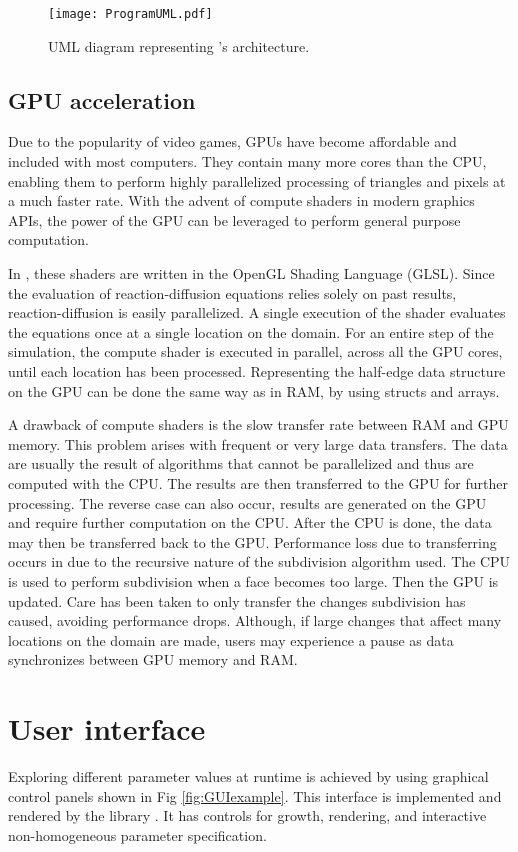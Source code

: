 \begin{figure}[H]
	\centering
	\texttt{[image: ProgramUML.pdf]}
	\caption{UML diagram representing \ProgramName{}'s architecture.}
	\label{fig:umlDiagram}
\end{figure}

\subsection{GPU acceleration}
Due to the popularity of video games, GPUs have become affordable and included with most computers. They contain many more cores than the CPU, enabling them to perform highly parallelized processing of triangles and pixels at a much faster rate. With the advent of compute shaders in modern graphics APIs, the power of the GPU can be leveraged to perform general purpose computation. 

In \ProgramName{}, these shaders are written in the OpenGL Shading Language (GLSL). Since the evaluation of reaction-diffusion equations relies solely on past results, reaction-diffusion is easily parallelized. A single execution of the shader evaluates the equations once at a single location on the domain. For an entire step of the simulation, the compute shader is executed in parallel, across all the GPU cores, until each location has been processed. Representing the half-edge data structure on the GPU can be done the same way as in RAM, by using structs and arrays.

A drawback of compute shaders is the slow transfer rate between RAM and GPU memory. This problem arises with frequent or very large data transfers. The data are usually the result of algorithms that cannot be parallelized and thus are computed with the CPU. The results are then transferred to the GPU for further processing. The reverse case can also occur, results are generated on the GPU and require further computation on the CPU. After the CPU is done, the data may then be transferred back to the GPU. Performance loss due to transferring occurs in \ProgramName{} due to the recursive nature of the subdivision algorithm used. The CPU is used to perform subdivision when a face becomes too large. Then the GPU is updated. Care has been taken to only transfer the changes subdivision has caused, avoiding performance drops. Although, if large changes that affect many locations on the domain are made, users may experience a pause as data synchronizes between GPU memory and RAM. 

\section{User interface}
Exploring different parameter values at runtime is achieved by using graphical control panels shown in Fig \ref{fig:GUIexample}. This interface is implemented and rendered by the library  \citep{Cornut2019}. It has controls for growth, rendering, and interactive non-homogeneous parameter specification. 

